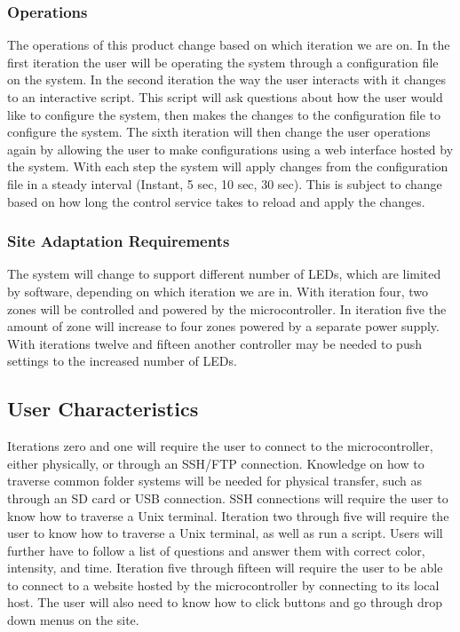 			\subsubsection{Operations}
				The operations of this product change based on which iteration we are on. In the first iteration the user will be operating the system through a configuration file on the system. In the second iteration
				the way the user interacts with it changes to an interactive script. This script will ask questions about how the user would like to configure the system, then makes the changes to the configuration file to configure the system.
				The sixth iteration will then change the user operations again by allowing the user to make configurations using a web interface hosted by the system. With each step the system will apply changes from the configuration file
				in a steady interval (Instant, 5 sec, 10 sec, 30 sec). This is subject to change based on how long the control service takes to reload and apply the changes.
			\subsubsection{Site Adaptation Requirements}
				The system will change to support different number of LEDs, which are limited by software, depending on which iteration we are in. With iteration four, two zones will be controlled and powered by the microcontroller.
				In iteration five the amount of zone will increase to four zones powered by a separate power supply. With iterations twelve and fifteen another controller may be needed to push settings to the increased number of LEDs.


		\subsection{User Characteristics}
		Iterations zero and one will require the user to connect to the microcontroller, either physically, or through an SSH/FTP connection. Knowledge on how to traverse common folder systems will be needed for physical transfer, such as
		through an SD card or USB connection. SSH connections will require the user to know how to traverse a Unix terminal.
		Iteration two through five will require the user to know how to traverse a Unix terminal, as well as run a script. Users will further have to follow a list of questions and answer them with correct color, intensity, and time.
		Iteration five through fifteen will require the user to be able to connect to a website hosted by the microcontroller by connecting to its local host. The user will also need to know how to click buttons and go through drop down menus on the site.


